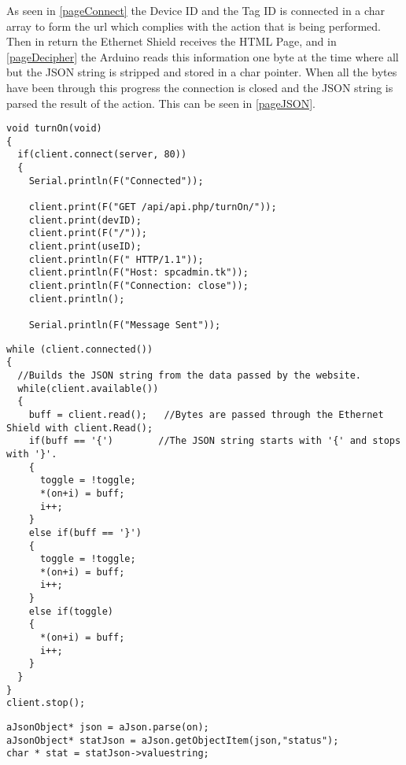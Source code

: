 As seen in \autoref{pageConnect} the Device ID and the Tag ID is connected in a char array to form the url which complies with the action that is being performed. 
Then in return the Ethernet Shield receives the HTML Page, and in \autoref{pageDecipher} the Arduino reads this information one byte at the time where all but the JSON string is stripped and stored in a char pointer.
When all the bytes have been through this progress the connection is closed and the JSON string is parsed the result of the action. This can be seen in \autoref{pageJSON}.
\begin{lstlisting}[frame=single, label=pageConnect, caption=Connecting to the Server and creating an HTML request.]
void turnOn(void)
{
  if(client.connect(server, 80))
  {
    Serial.println(F("Connected")); 

    client.print(F("GET /api/api.php/turnOn/"));
    client.print(devID);
    client.print(F("/"));
    client.print(useID);
    client.println(F(" HTTP/1.1"));
    client.println(F("Host: spcadmin.tk"));
    client.println(F("Connection: close"));
    client.println();
    
    Serial.println(F("Message Sent"));
\end{lstlisting}

\begin{lstlisting}[frame=single, label=pageDecipher, caption=Removing all but the important information from the website.]
while (client.connected())
{
  //Builds the JSON string from the data passed by the website.
  while(client.available()) 
  { 
    buff = client.read();   //Bytes are passed through the Ethernet Shield with client.Read();
    if(buff == '{')        //The JSON string starts with '{' and stops with '}'.
    {
      toggle = !toggle;
      *(on+i) = buff;
      i++;
    }
    else if(buff == '}')
    {
      toggle = !toggle;
      *(on+i) = buff;
      i++;
    }
    else if(toggle)
    {
      *(on+i) = buff;
      i++;
    }
  }
}
client.stop();
\end{lstlisting}

\begin{lstlisting}[frame=single, label=pageJSON, caption=The JSON Code Getting a value with a Token.]
aJsonObject* json = aJson.parse(on);
aJsonObject* statJson = aJson.getObjectItem(json,"status");
char * stat = statJson->valuestring;
\end{lstlisting}